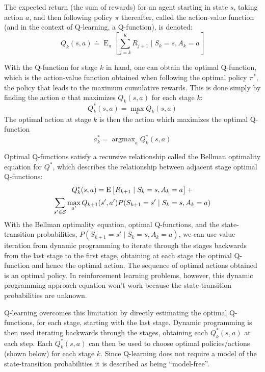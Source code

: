 \documentclass[12pt]{article}
\DeclareMathOperator*{\argmax}{argmax}
\begin{document}
The expected return (the sum of rewards) for an agent starting in state $s$, taking action $a$, and then following policy $\pi$ thereafter, called the action-value function (and in the context of Q-learning, a Q-function), is denoted:
\begin{equation}
  Q_{k}(s,a) \doteq
    \operatorname{E}_{\pi}\left[
      \sum_{j=k}^{K} R_{j+1} \mid S_{k} = s, A_{k} = a
    \right]
\end{equation}

With the Q-function for stage \( k \) in hand, one can obtain the optimal Q-function, which is the action-value function obtained when following the optimal policy \( \pi^{*} \), the policy that leads to the maximum cumulative rewards. This is done simply by finding the action \( a \) that maximizes \( Q_{k}(s,a) \) for each stage \( k \):
\begin{equation}
   Q^{*}_{k}(s, a) = \max_{a} Q_{k}(s, a)
\end{equation}
The optimal action at stage \( k \) is then the action which maximizes the optimal Q-function
\begin{equation}
  a^{*}_{k} = \argmax_{a} Q^{*}_{k}(s, a)
\end{equation}

Optimal Q-functions satisfy a recursive relationship called the Bellman optimality equation for \( Q^{*} \), which describes the relationship between adjacent stage optimal Q-functions:
\begin{multline}
    Q^{*}_{k}(s, a) = \operatorname{E}\sbr{R_{k+1} \mid S_k = s, A_k = a} + \\ \sum_{s' \in \mathcal{S}} \max_{a'} Q_{k+1}(s', a') %
    P(S_{k+1} = s' \mid S_k = s, A_k = a)
\end{multline} 
With the Bellman optimality equation, optimal Q-functions, and the state-transition probabilities, \( P(S_{k+1} = s' \mid S_k = s, A_k = a) \), we can use value iteration from dynamic programming to iterate through the stages backwards from the last stage to the first stage, obtaining at each stage the optimal Q-function and hence the optimal action. The sequence of optimal actions obtained is an optimal policy. In reinforcement learning problems, however, this dynamic programming approach equation won't work because the state-transition probabilities are unknown.

Q-learning overcomes this limitation by directly estimating the optimal Q-functions, for each stage, starting with the last stage. Dynamic programming is then used iterating backwards through the stages, obtaining each \( Q^{*}_{k}(s, a) \) at each step. Each  \( Q^{*}_{k}(s, a) \) can then be used to choose optimal policies/actions (shown below) for each stage \( k \). Since Q-learning does not require a model of the state-transition probabilities it is described as being ``model-free''.
\end{document}
